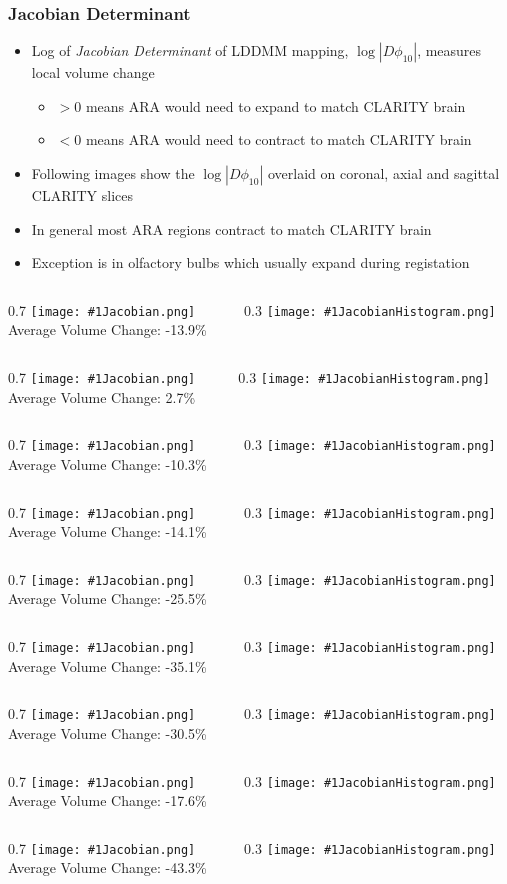 \documentclass[10pt]{beamer}
\newcommand{\jacobianframe}[2]
{
 \begin{frame}

  \begin{columns}
   \begin{column}{0.7\textwidth}
    \texttt{[image: \#1Jacobian.png]} \\
    Average Volume Change: #2
   \end{column}
   \begin{column}{0.3\textwidth}
    \texttt{[image: \#1JacobianHistogram.png]}
   \end{column}
  \end{columns}
 \end{frame}
}
\begin{document}
 \begin{frame}
  \frametitle{Jacobian Determinant}
  \begin{itemize}
   \item Log of \emph{Jacobian Determinant} of LDDMM mapping, $\log |D\phi_{10}|$, measures local volume change
    \begin{itemize}
    \item $>0$ means ARA would need to expand to match CLARITY brain
    \item $<0$ means ARA would need to contract to match CLARITY brain
    \end{itemize}
   \item Following images show the $\log |D\phi_{10}|$ overlaid on coronal, axial and sagittal CLARITY slices
   \item In general most ARA regions contract to match CLARITY brain
   \item Exception is in olfactory bulbs which usually expand during registation
  \end{itemize}
 \end{frame}
 \jacobianframe{Cocaine174}{-13.9\%}
 \jacobianframe{Cocaine175}{2.7\%}
 \jacobianframe{Cocaine178}{-10.3\%}
 \jacobianframe{Control181}{-14.1\%}
 \jacobianframe{Control182}{-25.5\%}
 \jacobianframe{Control239}{-35.1\%}
 \jacobianframe{Control258}{-30.5\%}
 \jacobianframe{Fear197}{-17.6\%}
 \jacobianframe{Fear199}{-43.3\%}
\end{document}
